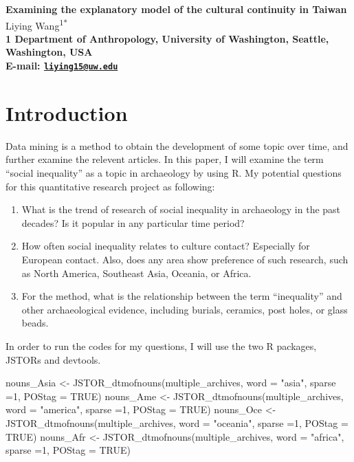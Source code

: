 \documentclass[10pt]{article}
\date{}
\newenvironment{CodeChunk}{}{}
\begin{document}
\begin{flushleft}
{\Large
\textbf{Examining the explanatory model of the cultural continuity in Taiwan}
}
\\
  Liying Wang\textsuperscript{1*}\\
\bf{1} Department of Anthropology, University of Washington,  Seattle,  Washington,  USA
\\

\textasteriskcentered{} E-mail:   \href{mailto:liying15@uw.edu}{\nolinkurl{liying15@uw.edu}}

\end{flushleft}

\section{Introduction}\label{introduction}

Data mining is a method to obtain the development of some topic over
time, and further examine the relevent articles. In this paper, I will
examine the term ``social inequality'' as a topic in archaeology by
using R. My potential questions for this quantitative research project
as following:

\begin{enumerate}
\def\labelenumi{\arabic{enumi}.}
\item
  What is the trend of research of social inequality in archaeology in
  the past decades? Is it popular in any particular time period?
\item
  How often social inequality relates to culture contact? Especially for
  European contact. Also, does any area show preference of such
  research, such as North America, Southeast Asia, Oceania, or Africa.
\item
  For the method, what is the relationship between the term
  ``inequality'' and other archaeological evidence, including burials,
  ceramics, post holes, or glass beads.
\end{enumerate}

In order to run the codes for my questions, I will use the two R
packages, JSTORs and devtools.

\begin{CodeChunk}
\begin{CodeInput}
nouns_Asia <- JSTOR_dtmofnouns(multiple_archives, word = "asia", sparse =1, POStag = TRUE)
nouns_Ame <- JSTOR_dtmofnouns(multiple_archives, word = "america", sparse =1, POStag = TRUE)
nouns_Oce <- JSTOR_dtmofnouns(multiple_archives, word = "oceania", sparse =1, POStag = TRUE)
nouns_Afr <- JSTOR_dtmofnouns(multiple_archives, word = "africa", sparse =1, POStag = TRUE)
\end{CodeInput}
\end{CodeChunk}
\end{document}
